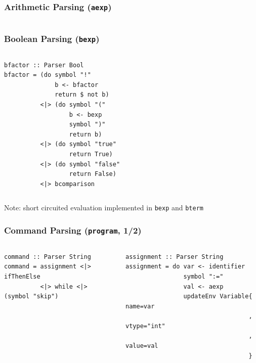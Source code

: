 \documentclass{beamer}
\begin{document}
\begin{frame}
	\frametitle{Arithmetic Parsing (\texttt{aexp})}
	\begin{columns}
		
		
		
	\end{columns}
\end{frame}

\begin{frame}[fragile]
	\frametitle{Boolean Parsing (\texttt{bexp})}
	\begin{columns}
		\column{0.4\textwidth}
		
\begin{lstlisting}[basicstyle=\ttfamily\tiny]
bfactor :: Parser Bool
bfactor = (do symbol "!"
              b <- bfactor
              return $ not b)
          <|> (do symbol "("
                  b <- bexp
                  symbol ")"
                  return b)
          <|> (do symbol "true"
                  return True)
          <|> (do symbol "false"
                  return False)
          <|> bcomparison
\end{lstlisting}
		\column{0.4\textwidth}
		
		
	\end{columns}
	\centerline{\scriptsize Note: short circuited evaluation implemented in \texttt{bexp} and \texttt{bterm}}
\end{frame}

\begin{frame}[fragile]
	\frametitle{Command Parsing (\texttt{program}, 1/2)}
	\begin{columns}
		\column{0.45\textwidth}
		
\begin{lstlisting}[basicstyle=\ttfamily\tiny]
command :: Parser String
command = assignment <|> ifThenElse
          <|> while <|> (symbol "skip")
\end{lstlisting}
\begin{lstlisting}[basicstyle=\ttfamily\tiny]
assignment :: Parser String
assignment = do var <- identifier
                symbol ":="
                val <- aexp
                updateEnv Variable{ name=var
                                  , vtype="int"
                                  , value=val
                                  }
\end{lstlisting}
		\column{0.45\textwidth}
		
	\end{columns}
\end{frame}
\end{document}
